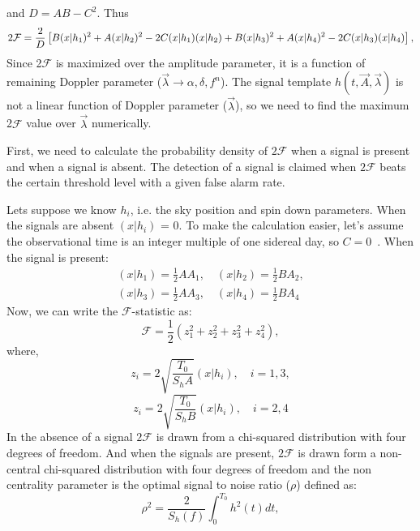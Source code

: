 \documentclass{ttuthes2007}
\begin{document}
and $D=AB-C^2$. Thus
\begin{equation}
\small
2\mathcal{F}=\frac{2}{D}\left[B(x|h_1)^2 + A(x|h_2)^2 -2C(x|h_1)(x|h_2)+
B(x|h_3)^2 + A(x|h_4)^2 -2C(x|h_3)(x|h_4)\right],
\end{equation}
Since 2$\mathcal{F}$ is maximized over the amplitude parameter, it is a
function of remaining Doppler parameter ($\vec{\lambda}\rightarrow \alpha,\delta,f^n$). The signal
template $h(t,\vec{A},\vec{\lambda})$ is not a linear function of Doppler
parameter ($\vec{\lambda}$), so we need to find the maximum 2$\mathcal{F}$ value over
$\vec{\lambda}$ numerically. 

First, we need to calculate the probability density of $2\mathcal{F}$ when a
signal is present and when a signal is absent. The detection of a signal is claimed
when $2\mathcal{F}$ beats the certain threshold level with a given false alarm
rate. 

Lets suppose we know $h_i$, i.e. the sky position and spin down parameters. When
the signals are absent $(x|h_i)$ = 0. To make the calculation easier, let's
assume the observational time is an integer multiple of one sidereal day, so $C
= 0$~\cite{Jaranowski_2000}. When the signal is present:
\begin{align*}
(x|h_1)= \frac{1}{2}AA_1, \quad (x|h_2) = \frac{1}{2}B A_2,\\
(x|h_3)= \frac{1}{2}AA_3, \quad (x|h_4) = \frac{1}{2}B A_4
\end{align*}
Now, we can write the $\mathcal{F}$-statistic as:
\begin{equation}
\mathcal{F} = \frac{1}{2}(z_1^2+z_2^2+z_3^2+z_4^2),
\end{equation}
where,
\begin{equation}
z_i=2\sqrt{\frac{T_0}{S_hA}}(x|h_i), \quad i=1,3,
\end{equation}
\begin{equation}
z_i=2\sqrt{\frac{T_0}{S_hB}}(x|h_i), \quad i=2,4
\end{equation}
In the absence of a signal $2\mathcal{F}$ is drawn from a chi-squared distribution with four
degrees of freedom. And when the signals are present, $2\mathcal{F}$ is
drawn form a
non-central chi-squared distribution with four degrees of freedom and the non
centrality parameter is the optimal signal to noise ratio ($\rho$) defined as:
\begin{equation}
\rho^2=\frac{2}{S_h(f)}\int_0^{T_0} h^2(t)dt,
\end{equation}
\end{document}
